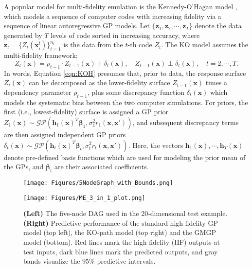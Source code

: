 \documentclass[12pt]{article}
\newcommand{\bs}[1]{\boldsymbol{#1}}
\begin{document}
A popular model for multi-fidelity emulation is the Kennedy-O'Hagan model \citep{KOH2000}, which models a sequence of computer codes with increasing fidelity via a sequence of linear autoregressive GP models. Let  $\{\bs{z}_1,\bs{z}_2,\cdots,\bs{z}_T\}$ denote the data generated by $T$ levels of code sorted in increasing accuracy, where $\bs{z}_t = \{ Z_t(\bs{x}^t_i)\}_{i=1}^{n_t}$ is the data from the $t$-th code $Z_t$. The KO model assumes the multi-fidelity framework:
\begin{equation}
    \label{eqn:KOH}
      Z_t(\bs{x}) = \rho_{t-1}\cdot Z_{t-1}(\bs{x}) + \delta_t(\bs{x}), \quad Z_{t-1}(\bs{x})\perp \delta_t(\bs{x}), \quad t=2,\cdots,T.
\end{equation}
In words, Equation \eqref{eqn:KOH} presumes that, prior to data, the response surface $Z_t(\bs{x})$ can be decomposed as the lower-fidelity surface $Z_{t-1}(\bs{x})$ times a dependency parameter $\rho_{t-1}$, plus some discrepancy function $\delta_t(\bs{x})$ which models the systematic bias between the two computer simulations. For priors, the first (i.e., lowest-fidelity) surface is assigned a GP prior $Z_1(\bs{x})\sim \mathcal{GP}(\bs{h}_1(\bs{x})^T\bs{\beta}_1,\sigma_1^2r_1(\bs{x},\bs{x}'))$, and subsequent discrepancy terms are then assigned independent GP priors $\delta_t(\bs{x})\sim \mathcal{GP}(\bs{h}_t(\bs{x})^T\bs{\beta}_t,\sigma_t^2r_t(\bs{x},\bs{x}'))$. Here, the vectors $\bs{h}_1(\bs{x}), \cdots, \bs{h}_T(\bs{x})$ denote pre-defined basis functions which are used for modeling the prior mean of the GPs, and $\bs{\beta}_t$ are their associated coefficients.

\begin{figure}
\begin{minipage}{0.35\linewidth}
    \centering
    \texttt{[image: Figures/5NodeGraph\_with\_Bounds.png]}
\end{minipage}
\hspace{0.05\linewidth}
\begin{minipage}{0.6\linewidth}
    \centering
    \texttt{[image: Figures/ME\_3\_in\_1\_plot.png]}
\end{minipage}
\caption{\textbf{(Left)} The five-node DAG used in the 20-dimensional test example. \textbf{(Right)} Predictive performance of the standard high-fidelity GP model (top left), the KO-path model (top right) and the GMGP model (bottom). Red lines mark the high-fidelity (HF) outputs at test inputs, dark blue lines mark the predicted outputs, and gray bands visualize the 95\% predictive intervals.}
\label{fig:motivation}
\end{figure}
\end{document}
